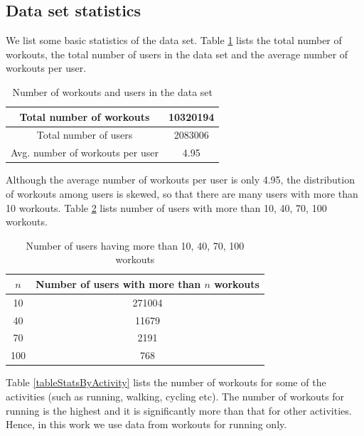 \documentclass{acm_proc_article-sp}
\begin{document}
\subsection{Data set statistics}

We list some basic statistics of the data set. Table \ref{tableStatsTotal} lists the total number of workouts, the total number of users in the data set and the average number of workouts per user.

\begin{table}[h]
\centering
\begin{tabular}{|c|c|} \hline
Total number of workouts & 10320194  \\ \hline
Total number of users  &  2083006 \\ \hline
Avg. number of workouts per user & 4.95 \\ \hline
\end{tabular}
\caption{Number of workouts and users in the data set}
\label{tableStatsTotal}
\end{table}

Although the average number of workouts per user is only 4.95, the distribution of workouts among users is skewed, so that there are many users with more than 10 workouts. Table \ref{tableStatsUsers} lists number of users with more than 10, 40, 70, 100 workouts.

\begin{table}[h]
\centering
\begin{tabular}{|c|c|} \hline
\bf{$n$} & \bf{Number of users with more than $n$ workouts}  \\ \hline
10  &  271004        \\ \hline
40  &  11679   \\ \hline
70  &  2191  \\ \hline
100 &  768 \\ \hline
\end{tabular}
\caption{Number of users having more than 10, 40, 70, 100 workouts}
\label{tableStatsUsers}
\end{table}

Table \ref{tableStatsByActivity} lists the number of workouts for some of the activities (such as running, walking, cycling etc). The number of workouts for running is the highest and it is significantly more than that for other activities. Hence, in this work we use data from workouts for running only.
\end{document}
